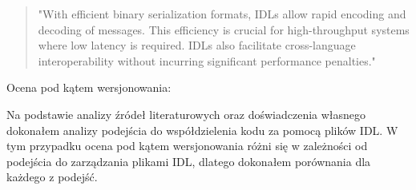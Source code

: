 \documentclass[runningheads,12pt]{llncs}
\begin{document}
\begin{quote}
    "With efficient binary serialization formats, IDLs allow rapid encoding and decoding of messages. This efficiency is crucial for high-throughput systems where low latency is required. IDLs also facilitate cross-language interoperability without incurring significant performance penalties." ~\cite[p. 123]{kleppmann2017designing}
\end{quote}

Ocena pod kątem wersjonowania:

Na podstawie analizy źródeł literaturowych oraz doświadczenia własnego dokonałem analizy podejścia do współdzielenia kodu za pomocą plików IDL. W tym przypadku ocena pod kątem wersjonowania różni się w zależności od podejścia do zarządzania plikami IDL, dlatego dokonałem porównania dla każdego z podejść.
\end{document}
